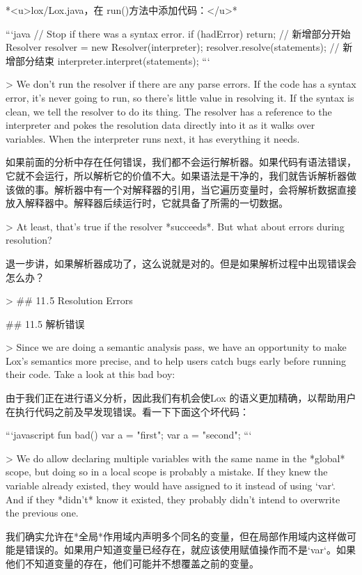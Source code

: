 \documentclass[cn,11pt,chinese]{elegantbook}
\begin{document}
{{{{{{{{{{{{{{{*<u>lox/Lox.java，在 run()方法中添加代码：</u>*

```java
    // Stop if there was a syntax error.
    if (hadError) return;
    // 新增部分开始
    Resolver resolver = new Resolver(interpreter);
    resolver.resolve(statements);
    // 新增部分结束
    interpreter.interpret(statements);
```

> We don’t run the resolver if there are any parse errors. If the code has a syntax error, it’s never going to run, so there’s little value in resolving it. If the syntax is clean, we tell the resolver to do its thing. The resolver has a reference to the interpreter and pokes the resolution data directly into it as it walks over variables. When the interpreter runs next, it has everything it needs.

如果前面的分析中存在任何错误，我们都不会运行解析器。如果代码有语法错误，它就不会运行，所以解析它的价值不大。如果语法是干净的，我们就告诉解析器做该做的事。解析器中有一个对解释器的引用，当它遍历变量时，会将解析数据直接放入解释器中。解释器后续运行时，它就具备了所需的一切数据。

> At least, that’s true if the resolver *succeeds*. But what about errors during resolution?

退一步讲，如果解析器成功了，这么说就是对的。但是如果解析过程中出现错误会怎么办？

> ## 11 . 5 Resolution Errors

## 11.5 解析错误

> Since we are doing a semantic analysis pass, we have an opportunity to make Lox’s semantics more precise, and to help users catch bugs early before running their code. Take a look at this bad boy:

由于我们正在进行语义分析，因此我们有机会使Lox 的语义更加精确，以帮助用户在执行代码之前及早发现错误。看一下下面这个坏代码：

```javascript
fun bad() {
  var a = "first";
  var a = "second";
}
```

> We do allow declaring multiple variables with the same name in the *global* scope, but doing so in a local scope is probably a mistake. If they knew the variable already existed, they would have assigned to it instead of using `var`. And if they *didn’t* know it existed, they probably didn’t intend to overwrite the previous one.

我们确实允许在*全局*作用域内声明多个同名的变量，但在局部作用域内这样做可能是错误的。如果用户知道变量已经存在，就应该使用赋值操作而不是`var`。如果他们不知道变量的存在，他们可能并不想覆盖之前的变量。

}}}}}}}}}}}}}}}
\end{document}
